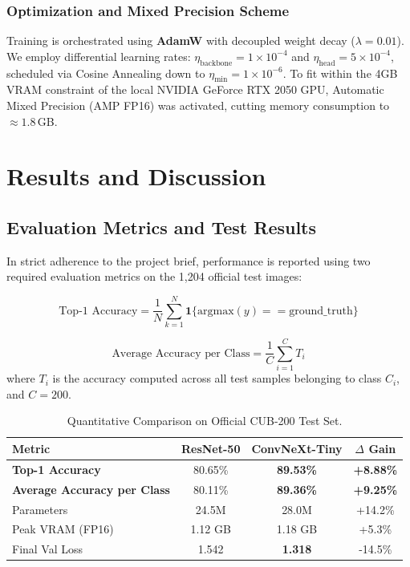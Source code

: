 \documentclass[10pt,twocolumn,letterpaper]{article}
\begin{document}
\subsubsection{Optimization and Mixed Precision Scheme}
Training is orchestrated using \textbf{AdamW} with decoupled weight decay ($\lambda = 0.01$). We employ differential learning rates: $\eta_{\text{backbone}} = 1\times 10^{-4}$ and $\eta_{\text{head}} = 5\times 10^{-4}$, scheduled via Cosine Annealing down to $\eta_{\text{min}} = 1\times 10^{-6}$. To fit within the 4GB VRAM constraint of the local NVIDIA GeForce RTX 2050 GPU, Automatic Mixed Precision (AMP FP16) was activated, cutting memory consumption to $\approx 1.8$\,GB.

\section{Results and Discussion}

\subsection{Evaluation Metrics and Test Results}
In strict adherence to the project brief, performance is reported using two required evaluation metrics on the 1,204 official test images:

\begin{equation}
    \text{Top-1 Accuracy} = \frac{1}{N} \sum_{k=1}^N \mathbf{1}\{\text{argmax}(y) == \text{ground\_truth}\}
\end{equation}

\begin{equation}
    \text{Average Accuracy per Class} = \frac{1}{C} \sum_{i=1}^C T_i
\end{equation}
where $T_i$ is the accuracy computed across all test samples belonging to class $C_i$, and $C = 200$.

\begin{table}[h]
\centering
\small
\caption{Quantitative Comparison on Official CUB-200 Test Set.}
\label{tab:results}
\begin{tabular}{lccc}
\toprule
\textbf{Metric} & \textbf{ResNet-50} & \textbf{ConvNeXt-Tiny} & \textbf{$\Delta$ Gain} \\
\midrule
\textbf{Top-1 Accuracy} & 80.65\% & \textbf{89.53\%} & \textbf{+8.88\%} \\
\textbf{Average Accuracy per Class} & 80.11\% & \textbf{89.36\%} & \textbf{+9.25\%} \\
Parameters & 24.5M & 28.0M & +14.2\% \\
Peak VRAM (FP16) & 1.12 GB & 1.18 GB & +5.3\% \\
Final Val Loss & 1.542 & \textbf{1.318} & -14.5\% \\
\bottomrule
\end{tabular}
\end{table}
\end{document}

